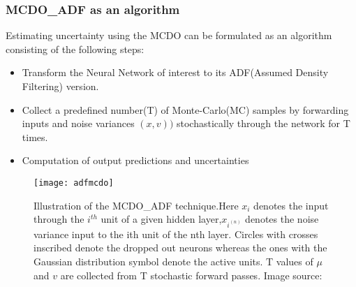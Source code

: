 	\subsubsection{MCDO\_ADF as an algorithm}
	Estimating uncertainty using the MCDO can be formulated as an algorithm consisting of the following steps:
	\begin{itemize}
		\item Transform the Neural Network of interest to its ADF(Assumed Density Filtering) version.
		\item Collect a predefined number(T) of Monte-Carlo(MC) samples by forwarding inputs and noise variances $(x,v))$ stochastically through the network for T times.
		\item Computation of output predictions and uncertainties  
	\end{itemize}
	\begin{figure}[h]
		\texttt{[image: adfmcdo]}
		\caption{Illustration of the MCDO\_ADF technique.Here $x_{i}$ denotes the input through the $i^{th}$ unit of a given hidden layer,$x_{i^{(n)}}$ denotes the noise variance input to the ith unit of the nth layer. Circles with crosses inscribed denote the dropped out neurons whereas the ones with the Gaussian distribution symbol denote the active units. T values of $\mu$ and $v$ are collected from T stochastic forward passes. Image source:\cite{loquercio2020a} }
		\label{fig_adf_mcdo}
	\end{figure}
	
	
	
	
	
